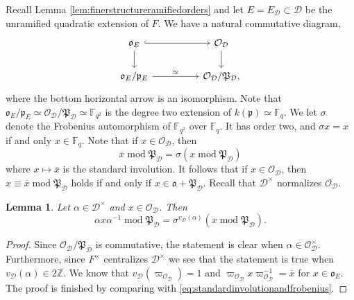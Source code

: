 \documentclass{article}
\newtheorem{lem}{Lemma}[section]
\theoremstyle{named}
\newcommand{\D}{\mathcal{D}}
\newcommand{\Z}{\mathbb{Z}}
\renewcommand{\O}{\mathcal{O}}
\renewcommand{\o}{\mathfrak{o}}
\renewcommand{\P}{\mathfrak{P}}
\newcommand{\p}{\mathfrak{p}}
\DeclareMathOperator{\modulo}{mod}
\begin{document}
Recall Lemma \ref{lem:finerstructureramifiedorders} and let $E = E_\D \subset \D$ be the unramified quadratic extension of $F$. We have a natural commutative diagram,
\begin{equation}\label{eq:diagramunramifiedinD}
\begin{tikzcd}
\o_E \arrow[rr, hook] \arrow[d]   &  & \O_\D \arrow[d] \\
\o_{E}/\p_{E} \arrow[rr, "\simeq"] &  & \O_\D/\P_\D,
\end{tikzcd}
\end{equation} 
where the bottom horizontal arrow is an isomorphism. Note that $\o_{E}/\p_{E} \simeq \O_\D /\P_\D \simeq \mathbb{F}_{q^2}$ is the degree two extension of $k(\p) \simeq \mathbb{F}_q$. We let $\sigma$ denote the Frobenius automorphism of $\mathbb{F}_{q^2}$ over $\mathbb{F}_q$. It has order two, and $\sigma x = x$ if and only $x \in \mathbb{F}_q$. Note that if $x \in \O_\D$, then
\begin{equation}\label{eq:standardinvolutionandfrobenius}
    \overline{x} \modulo \P_\D =  \sigma (x \modulo \P_\D)
\end{equation}
where $x \mapsto \overline{x}$ is the standard involution. It follows that if $x \in \O_\D$, then $x \equiv \overline{x} \modulo \P_\D$ holds if and only if $x \in \o + \P_\D$. Recall that $\D^\times$ normalizes $\O_\D$. 

\begin{lem}\label{lem:frobeniusconjugationquaternion}
Let $\alpha \in \D^\times$ and $x \in \O_\D$. Then 
\begin{equation}\label{auxeq:frobenius}
    \alpha x \alpha^{-1} \modulo \P_\D = \sigma^{v_\D(\alpha)} (x \modulo \P_\D).
\end{equation}
\end{lem}
\begin{proof}
Since $\O_\D/\P_\D$ is commutative, the statement is clear when $\alpha \in \O_\D^\times$. Furthermore, since $F^\times$ centralizes $\D^\times$ we see that the statement is true when $v_\D(\alpha) \in 2\Z$. We know that $v_\D(\varpi_{\O_\D}) = 1$ and $\varpi_{\O_\D} x \varpi_{\O_\D}^{-1} = \overline{x}$ for $x \in \o_{E}$. The proof is finished by comparing with \eqref{eq:standardinvolutionandfrobenius}.
\end{proof}
\end{document}
